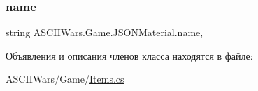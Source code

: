\subsubsection{\texorpdfstring{name}{name}}
{\footnotesize\ttfamily string A\+S\+C\+I\+I\+Wars.\+Game.\+J\+S\+O\+N\+Material.\+name\hspace{0.3cm}{\ttfamily [get]}, {\ttfamily [set]}}



Объявления и описания членов класса находятся в файле\+:\begin{DoxyCompactItemize}
\item 
A\+S\+C\+I\+I\+Wars/\+Game/\hyperlink{_items_8cs}{Items.\+cs}\end{DoxyCompactItemize}
